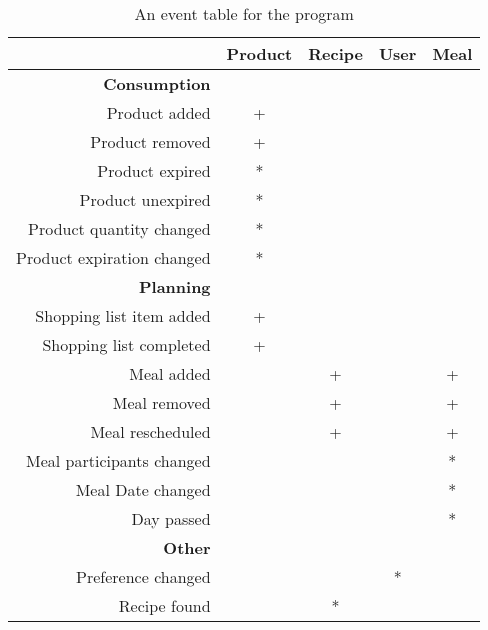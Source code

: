 \begin{table}
    \begin{tabular}{|r|c|c|c|c|}
        \hline
        ~                                      & Product & Recipe & User & Meal\\ \hline
        \textbf{Consumption}                   & ~       & ~      & ~    & ~   \\ 
		Product added                          & +       & ~      & ~    & ~   \\ 
        Product removed                        & +       & ~      & ~    & ~   \\ 
        Product expired                        & *       & ~      & ~    & ~   \\ 
        Product unexpired                      & *       & ~      & ~    & ~   \\ 
        Product quantity changed               & *       & ~      & ~    & ~   \\ 
        Product expiration changed             & *       & ~      & ~    & ~   \\ 
        \textbf{Planning}                      & ~       & ~      & ~    & ~   \\ 
        Shopping list item added               & +       & ~      & ~    & ~   \\ 
        Shopping list completed                & +       & ~      & ~    & ~   \\ 
        Meal added                             & ~       & +      & ~    & +   \\ 
        Meal removed                           & ~       & +      & ~    & +   \\ 
        Meal rescheduled                       & ~       & +      & ~    & +   \\ 
        Meal participants changed              & ~       & ~      & ~    & *   \\ 
        Meal Date changed                      & ~       & ~      & ~    & *   \\ 
        Day passed                             & ~       & ~      & ~    & *   \\ 
        \textbf{Other}                         & ~       & ~      & ~    & ~   \\ 
        Preference changed                     & ~       & ~      & *    & ~   \\ 
		Recipe found                           & ~       & *      & ~    & ~   \\ 
		\hline    
    \end{tabular}
    \caption{An event table for the program} 
    \label{tab:EventTable}
\end{table}